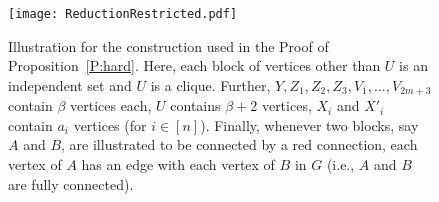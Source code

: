 \documentclass[runningheads]{llncs}
\begin{document}
\begin{figure}[htbp]
    \centering
    \vspace{-5mm}
    \texttt{[image: ReductionRestricted.pdf]}
    \caption{Illustration for the construction used in the Proof of Proposition~\ref{P:hard}. Here, each block of vertices other than $U$ is an independent set and $U$ is a clique. Further, $Y,Z_1,Z_2,Z_3, V_1,\ldots, V_{2m+3}$ contain $\beta$ vertices each, $U$ contains $\beta+2$ vertices, $X_i$ and $X'_i$ contain $a_i$ vertices (for $i\in [n]$). Finally, whenever two blocks, say $A$ and $B$, are illustrated to be connected by a red connection, each vertex of $A$ has an edge with each vertex of $B$ in $G$ (i.e., $A$ and $B$ are fully connected).}
    \label{fig:constrainedHardness}
\end{figure}
\end{document}
